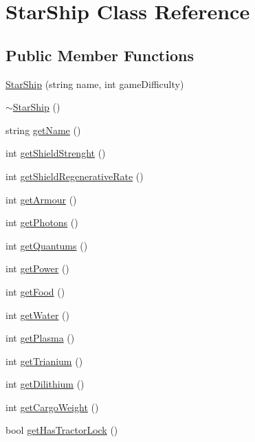 \hypertarget{classStarShip}{
\section{StarShip Class Reference}
\label{da/d97/classStarShip}
}
\subsection*{Public Member Functions}
\begin{DoxyCompactItemize}
\item 
\hyperlink{classStarShip_a616271a6df7759753f1919e1e244744e}{StarShip} (string name, int gameDifficulty)
\item 
\hyperlink{classStarShip_a334de38a2a083eeaf2e509f403db3124}{$\sim$StarShip} ()
\item 
string \hyperlink{classStarShip_a822cba8f4276378a9c4cec72213e1e80}{getName} ()
\item 
int \hyperlink{classStarShip_a34a3514784bb0bdb7a7688c5ff6ad033}{getShieldStrenght} ()
\item 
int \hyperlink{classStarShip_a6c5cf11fb023e98a6e23d7be9d41a984}{getShieldRegenerativeRate} ()
\item 
int \hyperlink{classStarShip_aaa27c8e41243ff314a53aa7d1c625456}{getArmour} ()
\item 
int \hyperlink{classStarShip_a48df1266b1b5d8ed36ad91bc0ac8e53b}{getPhotons} ()
\item 
int \hyperlink{classStarShip_a5859482046dae7a0ac2ad18c5714f6eb}{getQuantums} ()
\item 
int \hyperlink{classStarShip_a3bdba9448b3c6096f6973abccf2eca0c}{getPower} ()
\item 
int \hyperlink{classStarShip_af770b4878c7b724d96c0ed4e7d13c0fa}{getFood} ()
\item 
int \hyperlink{classStarShip_a83cb2a208ff3e0925671ab853679c400}{getWater} ()
\item 
int \hyperlink{classStarShip_a9da23f7827b3f10fb22b3b0e4cea8e52}{getPlasma} ()
\item 
int \hyperlink{classStarShip_a2cc968a0cf44328b29d79e7d4c30c013}{getTrianium} ()
\item 
int \hyperlink{classStarShip_a3c371aaeccfab3f6e406a14d25daca18}{getDilithium} ()
\item 
int \hyperlink{classStarShip_ac166ff73eb10a460810bfe3c190a24e3}{getCargoWeight} ()
\item 
bool \hyperlink{classStarShip_af072da551eff3b24cce85dd5f33efba3}{getHasTractorLock} ()

\end{DoxyCompactItemize}
